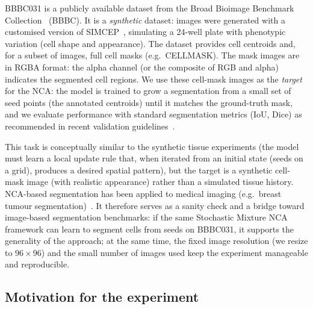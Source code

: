 BBBC031 is a publicly available dataset from the Broad Bioimage Benchmark Collection~\cite{ljosa2012annotated,bbbc031_ref} (BBBC).
It is a \emph{synthetic} dataset: images were generated with a customised version of SIMCEP~\cite{lehmussola2007simcep}, simulating a 24-well plate with phenotypic variation (cell shape and appearance).
The dataset provides cell centroids and, for a subset of images, full cell masks (e.g.\ CELLMASK).
The mask images are in RGBA format: the alpha channel (or the composite of RGB and alpha) indicates the segmented cell regions.
We use these cell-mask images as the \emph{target} for the NCA: the model is trained to grow a segmentation from a small set of seed points (the annotated centroids) until it matches the ground-truth mask, and we evaluate performance with standard segmentation metrics (IoU, Dice) as recommended in recent validation guidelines~\cite{maierhein2024metrics}.

This task is conceptually similar to the synthetic tissue experiments (the model must learn a local update rule that, when iterated from an initial state (seeds on a grid), produces a desired spatial pattern), but the target is a synthetic cell-mask image (with realistic appearance) rather than a simulated tissue history.
NCA-based segmentation has been applied to medical imaging (e.g.\ breast tumour segmentation)~\cite{nca_jeandelle2024_breast}.
It therefore serves as a sanity check and a bridge toward image-based segmentation benchmarks: if the same Stochastic Mixture NCA framework can learn to segment cells from seeds on BBBC031, it supports the generality of the approach; at the same time, the fixed image resolution (we resize to \(96\times96\)) and the small number of images used keep the experiment manageable and reproducible.

\subsection{Motivation for the experiment}
\label{sec:impl:bbbc031:motivation}

